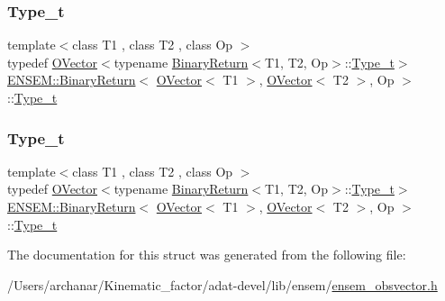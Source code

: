 \subsubsection{\texorpdfstring{Type\_t}{Type\_t}\hspace{0.1cm}{\footnotesize\ttfamily [2/3]}}
{\footnotesize\ttfamily template$<$class T1 , class T2 , class Op $>$ \\
typedef \mbox{\hyperlink{classENSEM_1_1OVector}{O\+Vector}}$<$typename \mbox{\hyperlink{structENSEM_1_1BinaryReturn}{Binary\+Return}}$<$T1, T2, Op$>$\+::\mbox{\hyperlink{structENSEM_1_1BinaryReturn_3_01OVector_3_01T1_01_4_00_01OVector_3_01T2_01_4_00_01Op_01_4_a4736776d1b4c658230ffbd7a77aa772a}{Type\+\_\+t}}$>$ \mbox{\hyperlink{structENSEM_1_1BinaryReturn}{E\+N\+S\+E\+M\+::\+Binary\+Return}}$<$ \mbox{\hyperlink{classENSEM_1_1OVector}{O\+Vector}}$<$ T1 $>$, \mbox{\hyperlink{classENSEM_1_1OVector}{O\+Vector}}$<$ T2 $>$, Op $>$\+::\mbox{\hyperlink{structENSEM_1_1BinaryReturn_3_01OVector_3_01T1_01_4_00_01OVector_3_01T2_01_4_00_01Op_01_4_a4736776d1b4c658230ffbd7a77aa772a}{Type\+\_\+t}}}

\mbox{\label{structENSEM_1_1BinaryReturn_3_01OVector_3_01T1_01_4_00_01OVector_3_01T2_01_4_00_01Op_01_4_a4736776d1b4c658230ffbd7a77aa772a}} 
\subsubsection{\texorpdfstring{Type\_t}{Type\_t}\hspace{0.1cm}{\footnotesize\ttfamily [3/3]}}
{\footnotesize\ttfamily template$<$class T1 , class T2 , class Op $>$ \\
typedef \mbox{\hyperlink{classENSEM_1_1OVector}{O\+Vector}}$<$typename \mbox{\hyperlink{structENSEM_1_1BinaryReturn}{Binary\+Return}}$<$T1, T2, Op$>$\+::\mbox{\hyperlink{structENSEM_1_1BinaryReturn_3_01OVector_3_01T1_01_4_00_01OVector_3_01T2_01_4_00_01Op_01_4_a4736776d1b4c658230ffbd7a77aa772a}{Type\+\_\+t}}$>$ \mbox{\hyperlink{structENSEM_1_1BinaryReturn}{E\+N\+S\+E\+M\+::\+Binary\+Return}}$<$ \mbox{\hyperlink{classENSEM_1_1OVector}{O\+Vector}}$<$ T1 $>$, \mbox{\hyperlink{classENSEM_1_1OVector}{O\+Vector}}$<$ T2 $>$, Op $>$\+::\mbox{\hyperlink{structENSEM_1_1BinaryReturn_3_01OVector_3_01T1_01_4_00_01OVector_3_01T2_01_4_00_01Op_01_4_a4736776d1b4c658230ffbd7a77aa772a}{Type\+\_\+t}}}



The documentation for this struct was generated from the following file\+:\begin{DoxyCompactItemize}
\item 
/\+Users/archanar/\+Kinematic\+\_\+factor/adat-\/devel/lib/ensem/\mbox{\hyperlink{adat-devel_2lib_2ensem_2ensem__obsvector_8h}{ensem\+\_\+obsvector.\+h}}\end{DoxyCompactItemize}
